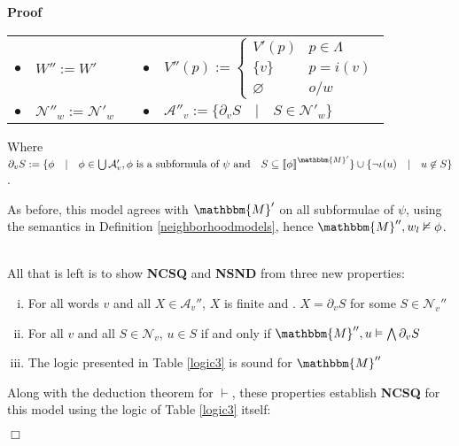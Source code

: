 \documentclass{article}
\newcommand{\assign}{:=}
\newcommand{\nin}{\not\in}
\newcommand{\tmtextbf}[1]{{\bfseries{#1}}}
\newenvironment{enumerateroman}{\begin{enumerate}[i.] }{\end{enumerate}}
\newenvironment{proof}{\noindent\textbf{Proof\ }}{\hspace*{\fill}$\Box$\medskip}
\begin{document}
\begin{proof}
  \begin{center}
    \begin{tabular}{lllll}
      $\bullet$ & $W'' \assign W'$ &  & $\bullet$ & $V'' (p) \assign \left\{
      \begin{array}{ll}
        V' (p) & p \in \Lambda\\
        \{v\} & p = i (v)\\
        \varnothing & o / w
      \end{array} \right.$\\
      $\bullet$ & $\mathcal{N}''_w \assign \mathcal{N}'_w$ & {\hspace{3em}} &
      $\bullet$ & $\mathcal{A}''_v \assign \{\partial_v S \hspace{1em} |
      \hspace{1em} S \in \mathcal{N}'_w \}$
    \end{tabular}
  \end{center}
  
  
  
  
  
  Where $\partial_v S \assign \{\phi \hspace{1em} | \hspace{1em} \phi \in
  \bigcup \mathcal{A}_v', \text{$\phi$ is a subformula of $\psi$ and}
  \hspace{1em} S \subseteq \left\llbracket \phi
  \right\rrbracket^{\mathbbm{M}'} \} \cup \{\neg \iota (u) \hspace{1em} |
  \hspace{1em} u \nin S\}$.
  
  As before, this model agrees with $\mathbbm{M}'$ on all subformulae of
  $\psi$, using the semantics in Definition \ref{neighborhoodmodels}, hence
  $\mathbbm{M}'', w_l \nvDash \phi$. \
  
  
  
  All that is left is to show \tmtextbf{NCSQ} and \tmtextbf{NSND} from three
  new properties:
  \begin{enumerateroman}
    \item For all words $v$ and all $X \in \mathcal{A}_v''$, $X$ is finite and
  .  $X = \partial_v S$ for some $S \in \mathcal{N}_v''$
    
    \item For all $v$ and all $S \in \mathcal{N}_v$, $u \in S$ if and only if
    $\mathbbm{M}'', u \vDash \bigwedge \partial_v S$
    
    \item The logic presented in Table \ref{logic3} is sound for
    $\mathbbm{M}''$
  \end{enumerateroman}
  Along with the deduction theorem for $\vdash$, these properties establish
  \tmtextbf{NCSQ} for this model using the logic of Table \ref{logic3} itself:
  

\end{proof}
\end{document}

